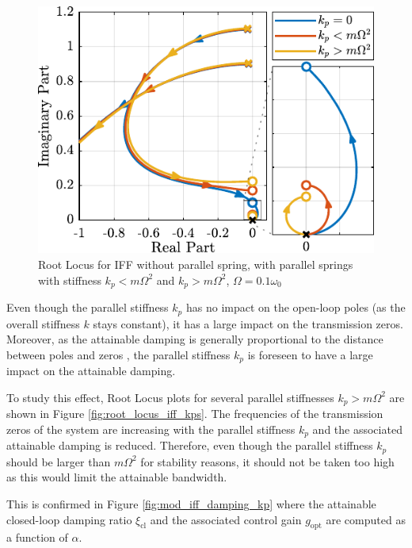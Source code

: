 \documentclass[Afour,sagev,times]{sagej}
\begin{document}
\begin{figure}[htbp]
\centering
\includegraphics[width=\linewidth]{figs/root_locus_iff_kp.pdf}
\caption{\label{fig:root_locus_iff_kp}Root Locus for IFF without parallel spring, with parallel springs with stiffness \(k_p < m \Omega^2\) and \(k_p > m \Omega^2\), \(\Omega = 0.1 \omega_0\)}
\end{figure}

\par
Even though the parallel stiffness \(k_p\) has no impact on the open-loop poles (as the overall stiffness \(k\) stays constant), it has a large impact on the transmission zeros.
Moreover, as the attainable damping is generally proportional to the distance between poles and zeros \cite{preumont18_vibrat_contr_activ_struc_fourt_edition}, the parallel stiffness \(k_p\) is foreseen to have a large impact on the attainable damping.

To study this effect, Root Locus plots for several parallel stiffnesses \(k_p > m \Omega^2\) are shown in Figure \ref{fig:root_locus_iff_kps}.
The frequencies of the transmission zeros of the system are increasing with the parallel stiffness \(k_p\) and the associated attainable damping is reduced.
Therefore, even though the parallel stiffness \(k_p\) should be larger than \(m \Omega^2\) for stability reasons, it should not be taken too high as this would limit the attainable bandwidth.

This is confirmed in Figure \ref{fig:mod_iff_damping_kp} where the attainable closed-loop damping ratio \(\xi_{\text{cl}}\) and the associated control gain \(g_\text{opt}\) are computed as a function of \(\alpha\).
\end{document}

